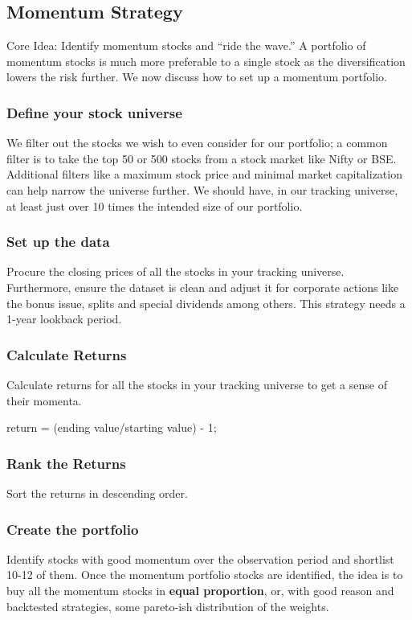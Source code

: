 \documentclass{article}
\begin{document}
\subsection{Momentum Strategy}
Core Idea: Identify momentum stocks and ``ride the wave.'' A portfolio of
momentum stocks is much more preferable to a single stock as the diversification
lowers the risk further. We now discuss how to set up a momentum portfolio.
\subsubsection{Define your stock universe}
We filter out the stocks we wish to even consider for our portfolio; a common
filter is to take the top 50 or 500 stocks from a stock market like Nifty or BSE.
Additional filters like a maximum stock price and minimal market capitalization
can help narrow the universe further. We should have, in our tracking universe,
at least just over 10 times the intended size of our portfolio.
\subsubsection{Set up the data}
Procure the closing prices of all the stocks in your tracking universe. 
Furthermore, ensure the dataset is clean and adjust it for corporate actions
like the bonus issue, splits and special dividends among others. This strategy
needs a 1-year lookback period.
\subsubsection{Calculate Returns}
Calculate returns for all the stocks in your tracking universe to get a sense
of their momenta.
\begin{center}
    return = (ending value/starting value) - 1;
\end{center}
\subsubsection{Rank the Returns}
Sort the returns in descending order.
\subsubsection{Create the portfolio}
Identify stocks with good momentum over the observation period and shortlist 10-12
of them. Once the momentum portfolio stocks are identified, the idea is to buy
all the momentum stocks in \textbf{equal proportion}, or, with good reason and
backtested strategies, some pareto-ish distribution of the weights.
\end{document}
